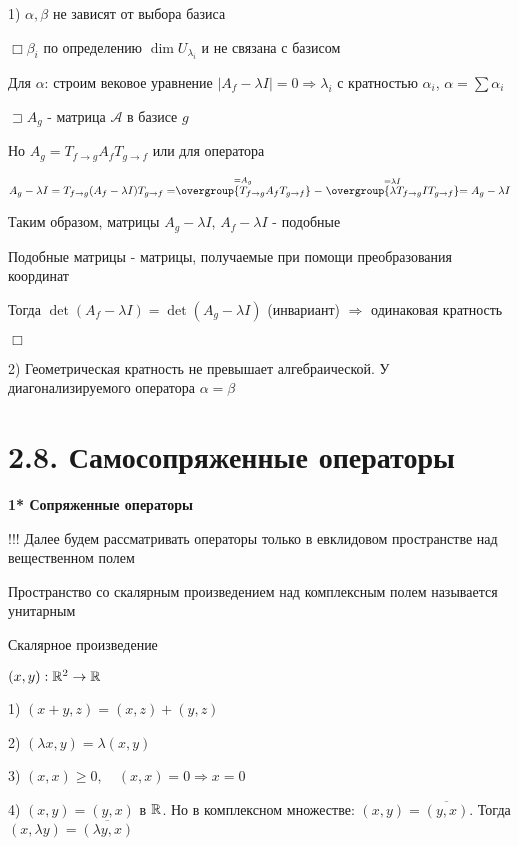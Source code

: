 \documentclass[12pt]{article}
\begin{document}
    1) $\alpha, \beta$ не зависят от выбора базиса

    $\Box \beta_i$ по определению $\dim U_{\lambda_i}$ и не связана с базисом

    Для $\alpha$: строим вековое уравнение $|A_f - \lambda I| = 0 \Longrightarrow \lambda_i$ с кратностью $\alpha_i$, $\alpha = \sum \alpha_i$

    $\sqsupset A_g$ - матрица $\mathcal{A}$ в базисе $g$

    Но $A_g = T_{f\to g} A_f T_{g\to f}$ или для оператора

    $A_g - \lambda I = T_{f\to g} (A_f - \lambda I) T_{g\to f} =
    \stackrel{= A_g}{\overgroup{T_{f\to g} A_f T_{g\to f}}} - \stackrel{= \lambda I}{\overgroup{\lambda T_{f\to g} I T_{g\to f}}} =
    A_g - \lambda I$

    Таким образом, матрицы $A_g - \lambda I$, $A_f - \lambda I$ - подобные

    \Def Подобные матрицы - матрицы, получаемые при помощи преобразования координат

    Тогда $\det (A_f - \lambda I) = \det (A_g - \lambda I)$ (инвариант) $\Longrightarrow$ одинаковая кратность

    $\Box$

    2) Геометрическая кратность не превышает алгебраической. У диагонализируемого оператора $\alpha = \beta$

    \section{2.8. Самосопряженные операторы}

    \textbf{1* Сопряженные операторы}

    !!! Далее будем рассматривать операторы только в евклидовом пространстве над вещественном полем

    Пространство со скалярным произведением над комплексным полем называется унитарным

    \Mem Скалярное произведение

    $(x, y) : \mathbb{R}^2 \rightarrow \mathbb{R}$

    1) $(x + y, z) = (x, z) + (y, z)$

    2) $(\lambda x, y) = \lambda (x, y)$

    3) $(x, x) \geq 0, \quad (x, x) = 0 \Longrightarrow x = 0$

    4) $(x, y) = (y, x)$ в $\mathbb{R}$. Но в комплексном множестве: $(x, y) = \overline{(y, x)}$. Тогда $(x, \lambda y) = \overline{(\lambda y, x)}$
\end{document}
